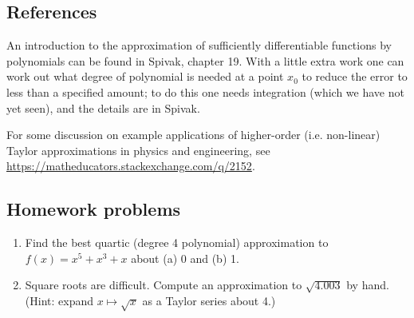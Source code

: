\subsection{References}
An introduction to the approximation of sufficiently differentiable functions by polynomials can be found
in Spivak, chapter 19. With a little extra work one can work out what degree of polynomial is needed at a
point $ x_0 $ to reduce the error to less than a specified amount; to do this one needs integration (which
we have not yet seen), and the details are in Spivak.

For some discussion on example applications of higher-order (i.e. non-linear) Taylor approximations in
physics and engineering, see \url{https://matheducators.stackexchange.com/q/2152}.

\subsection{Homework problems}
\begin{enumerate}
  \item Find the best quartic (degree 4 polynomial) approximation to $ f(x) = x^5 + x^3 + x $ about (a) 0 and (b) 1.
  \item Square roots are difficult. Compute an approximation to $ \sqrt{4.003} $ by hand. (Hint: expand $ x \mapsto \sqrt{x} $ as a Taylor series about 4.)
\end{enumerate}
